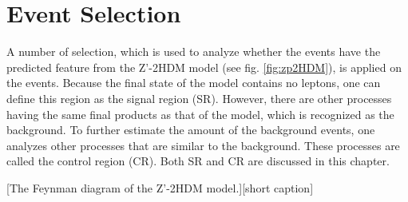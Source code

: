 \documentclass[class=NCU_thesis, crop=false]{standalone}
\begin{document}
\chapter{Event Selection}
A number of selection, which is used to analyze whether the events have the predicted feature from the Z'-2HDM model (see fig. \ref{fig:zp2HDM}), is applied on the events. Because the final state of the model contains no leptons, one can define this region as the signal region (SR). However, there are other processes having the same final products as that of the model, which is recognized as the background. To further estimate the amount of the background events, one analyzes other processes that are similar to the background. These processes are called the control region (CR). Both SR and CR are discussed in this chapter.

[The Feynman diagram of the Z'-2HDM model.][short caption]
\end{document}

